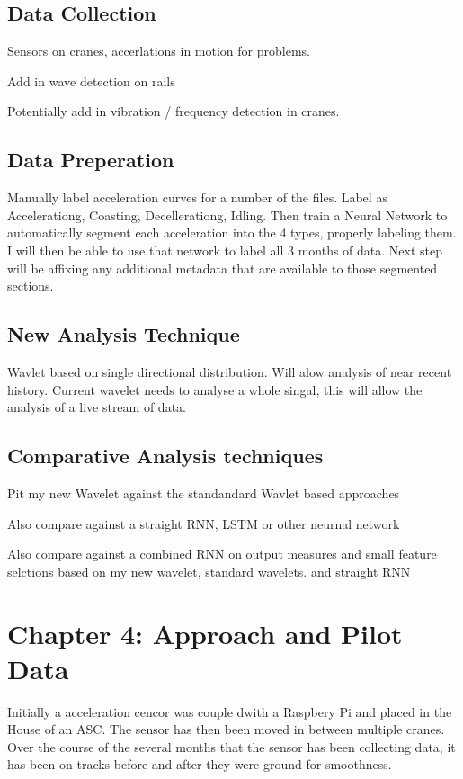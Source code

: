 \documentclass[journal=jacsat,manuscript=article]{achemso}
\begin{document}
\subsection{Data Collection}

Sensors on cranes, accerlations in motion for problems.

Add in wave detection on rails

Potentially add in vibration / frequency detection in cranes.

\subsection{Data Preperation}
Manually label acceleration curves for a number of the files.  Label as Accelerationg, Coasting, Decellerationg, Idling.  Then train a Neural Network to automatically segment each acceleration into the 4 types, properly labeling them.  I will then be able to use that network to label all 3 months of data.  Next step will be affixing any additional metadata that are available to those segmented sections.

\subsection{New Analysis Technique}
Wavlet based on single directional distribution.  Will alow analysis of near recent history.  Current wavelet needs to analyse a whole singal, this will allow the analysis of a live stream of data.

\subsection{Comparative Analysis techniques}
Pit my new Wavelet against the standandard Wavlet based approaches

Also compare against a straight RNN, LSTM or other neurnal network

Also compare against a combined RNN on output measures and small feature selctions based on my new wavelet, standard wavelets. and straight RNN

\pagebreak
\section{Chapter 4: Approach and Pilot Data}

Initially a acceleration cencor was couple dwith a Raspbery Pi and placed in the House of an ASC.  The sensor has then been moved in between multiple cranes.  Over the course of the several months that the sensor has been collecting data, it has been on tracks before and after they were ground for smoothness.  
\end{document}
